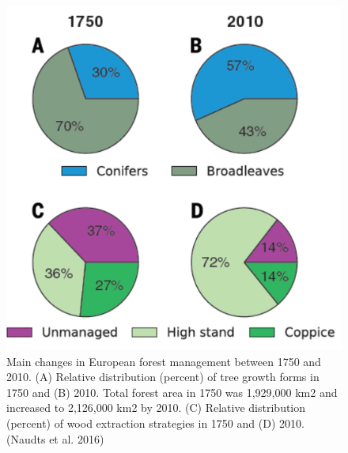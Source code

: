 \documentclass[
  12pt,
  oneside]{book}
\begin{document}
\begin{figure}

{\centering \includegraphics[width=0.8\linewidth]{figures/chap8/f816_naudts1} 

}

\caption{Main changes in European forest management between 1750 and 2010. (A) Relative distribution (percent) of tree growth forms in 1750 and (B) 2010. Total forest area in 1750 was 1,929,000 km2 and increased to 2,126,000 km2 by 2010. (C) Relative distribution (percent) of wood extraction strategies in 1750 and (D) 2010. (Naudts et al. 2016)}\label{fig:f816}
\end{figure}
\end{document}
